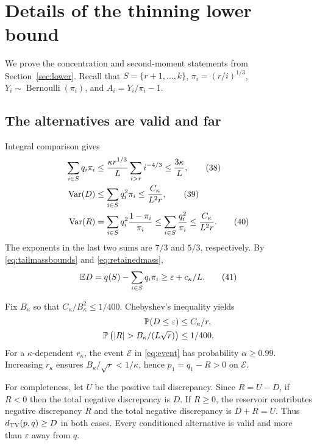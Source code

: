 \section{Details of the thinning lower bound}
\label{app:lower}

We prove the concentration and second-moment statements from
Section~\ref{sec:lower}. Recall that $S=\{r+1,\ldots,k\}$,
$\pi_i=(r/i)^{1/3}$, $Y_i\sim\operatorname{Bernoulli}(\pi_i)$, and
$A_i=Y_i/\pi_i-1$.

\subsection{The alternatives are valid and far}

Integral comparison gives
\begin{align}
 \sum_{i\in S}q_i\pi_i
 &\leq\frac{\kappa r^{1/3}}{L}\sum_{i>r}i^{-4/3}
 \leq\frac{3\kappa}{L},                                  \tag{38}\label{eq:retainedmass}\\
 \operatorname{Var}(D)
 &\leq\sum_{i\in S}q_i^2\pi_i
 \leq\frac{C_\kappa}{L^2r},                             \tag{39}\label{eq:dvar}\\
 \operatorname{Var}(R)
 &=\sum_{i\in S}q_i^2\frac{1-\pi_i}{\pi_i}
 \leq\sum_{i\in S}\frac{q_i^2}{\pi_i}
 \leq\frac{C_\kappa}{L^2r}.                             \tag{40}\label{eq:rvar}
\end{align}
The exponents in the last two sums are $7/3$ and $5/3$, respectively.
By \eqref{eq:tailmassbounds} and \eqref{eq:retainedmass},
\[
 \mathbb E D=q(S)-\sum_{i\in S}q_i\pi_i
 \geq\varepsilon+c_\kappa/L.                            \tag{41}\label{eq:dmargin}
\]

Fix $B_\kappa$ so that $C_\kappa/B_\kappa^2\leq1/400$.
Chebyshev's inequality yields
\begin{align*}
 \Pp(D\leq\varepsilon)&\leq C_\kappa/r,\\
 \Pp\left(|R|>B_\kappa/(L\sqrt r)\right)&\leq1/400.
\end{align*}
For a $\kappa$-dependent $r_\kappa$, the event $\mathcal E$ in
\eqref{eq:event} has probability $\alpha\geq0.99$. Increasing
$r_\kappa$ ensures $B_\kappa/\sqrt r<1/\kappa$, hence
$p_1=q_1-R>0$ on $\mathcal E$.

For completeness, let $U$ be the positive tail discrepancy. Since
$R=U-D$, if $R<0$ then the total negative discrepancy is $D$. If
$R\geq0$, the reservoir contributes negative discrepancy $R$ and the
total negative discrepancy is $D+R=U$. Thus $d_{\mathrm{TV}}(p,q)\geq D$ in both
cases. Every conditioned alternative is valid and more than
$\varepsilon$ away from $q$.

